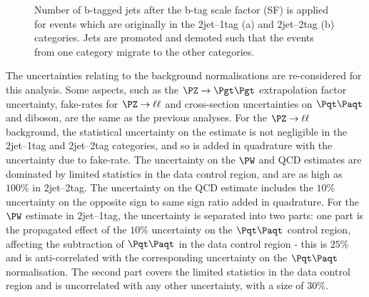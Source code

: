 \begin{figure}
\begin{center}

\end{center}
\caption[Number of b-tagged jets after the b-tag scale factor is applied for events which
are originally in the 2jet--1tag (a) and 2jet--2tag (b) categories.]{
Number of b-tagged jets after the b-tag scale factor (SF) is applied for events which
are originally in the 2jet--1tag (a) and 2jet--2tag (b) categories. Jets
are promoted and demoted such that the events from one category
migrate to the other categories.}
\label{fig:Hhhbtagsystematic}
\end{figure}

The uncertainties relating to the background normalisations are re-considered
for this analysis. Some aspects, such as the $\ZToTauTau$ extrapolation factor
uncertainty, fake-rates for $\PZ\to\ell\ell$ and cross-section uncertainties on
$\ttbar$ and diboson, are the same as the previous analyses. For the
$\PZ\to\ell\ell$ background, the statistical uncertainty on the estimate is not
negligible in the 2jet--1tag and 2jet--2tag categories, and so is added in
quadrature with the uncertainty due to fake-rate. The uncertainty on the
$\PW$ and QCD estimates are dominated by limited statistics in the data control
region, and are as high as $100\%$ in 2jet--2tag. The uncertainty on the QCD
estimate includes the $10\%$ uncertainty on the opposite sign to same sign ratio
added in quadrature. For the $\PW$ estimate in 2jet--1tag, the uncertainty is
separated into two parts: one part is the propagated effect of the $10\%$
uncertainty on the $\ttbar$ control region, affecting the subtraction of
$\ttbar$ in the data control region - this is $25\%$ and is anti-correlated with
the corresponding uncertainty on the $\ttbar$ normalisation. The second part
covers the limited statistics in the data control region and is uncorrelated
with any other uncertainty, with a size of $30\%$.

